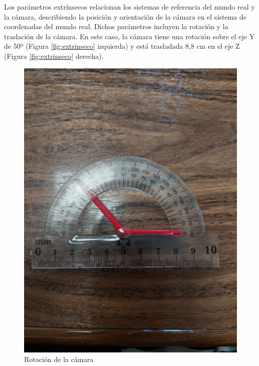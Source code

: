 Los parámetros extrínsecos relacionan los sistemas de referencia del mundo real y la cámara, describiendo la posición y orientación de la cámara en el sistema de coordenadas del mundo real. Dichos parámetros incluyen la rotación y la traslación de la cámara. En este caso, la cámara tiene una rotación sobre el eje Y de 50º (Figura \ref{fig:extrinseco} izquierda) y está trasladada 8,8 cm en el eje Z (Figura \ref{fig:extrinseco} derecha). 

\begin{figure}[ht!]
	\centering
	\begin{minipage}{0.35\linewidth}
		\centering
		\includegraphics[width=\linewidth]{figs/cap6/rotation.jpeg}
		\caption*{\centering Rotación de la cámara} 
	\end{minipage}
	\hspace{2 cm}
	\begin{minipage}{0.35\linewidth}
		\centering

\end{minipage}
\end{figure}
